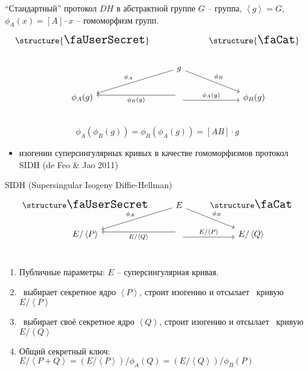 \documentclass{beamer}
\begin{document}
\begin{frame}[fragile]{``Стандартный'' протокол $DH$ в абстрактной группе}
	$G$ -- группа, $\left<g\right> = G$, $\phi_A(x) = [A] \cdot x$ -- гомоморфизм групп.
	\[
	\begin{tikzcd}
		\text{\structure{{\Large\faUserSecret}}} & & \text{\structure{{\Large\faCat}}} \\
		& \arrow{ld}[swap]{\phi_A} g \arrow{rd}{\phi_B}  \\
		\phi_A(g) & \arrow[yshift=-0.7ex]{r}{\phi_A(g)} \arrow[yshift=0.7ex]{l}{\phi_B(g)}  & \phi_B(g)\\
	\end{tikzcd}
	\]
	\[
	\phi_A(\phi_B(g)) = \phi_B(\phi_A(g)) = [A B]\cdot g
	\]
	\begin{itemize}
		\item изогении суперсингулярных кривых в качестве гомоморфизмов \structure{$\Rightarrow$} протокол SIDH (de Feo \& Jao 2011)
	\end{itemize}
\end{frame}

\begin{frame}[fragile]{SIDH (Supersingular Isogeny Diffie-Hellman)}
	\[
	\begin{tikzcd}
		\text{\UserA} &\arrow{ld}[swap]{\phi_{A}} E  \arrow{rd}{\phi_{B}} & \text{\UserB} \\
		E/\left<P\right> &
		\arrow[yshift=-0.7ex]{r}{E/\left<P\right>}
		\arrow[yshift=0.7ex]{l}{E/\left<Q\right>}
		& E/\left<Q\right>\\
	\end{tikzcd}
	\]
	\vspace{-0.5em}
	\vspace{0.5em}
	\begin{enumerate}
		\item Публичные параметры: $E$ -- суперсингулярная кривая.
		\item \UserA~выбирает секретное ядро $\left<P\right>$, строит изогению
		и отсылает \UserB~кривую
		$E/\left<P\right>$
		\item \UserB~выбирает своё секретное ядро $\left<Q\right>$, строит изогению
		и отсылает \UserA~кривую
		$E/\left<Q\right>$
		\item Общий секретный ключ: $E/\left<P+Q\right> = (E/\left<P\right>)/\phi_A(Q) = (E/\left<Q\right>)/\phi_B(P)$
	\end{enumerate}
\end{frame}
\end{document}
